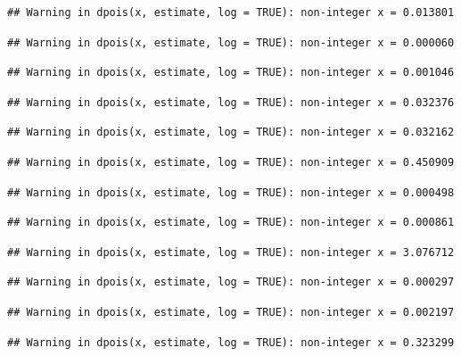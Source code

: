 \documentclass[]{article}
\begin{document}
\begin{verbatim}
## Warning in dpois(x, estimate, log = TRUE): non-integer x = 0.013801
\end{verbatim}

\begin{verbatim}
## Warning in dpois(x, estimate, log = TRUE): non-integer x = 0.000060
\end{verbatim}

\begin{verbatim}
## Warning in dpois(x, estimate, log = TRUE): non-integer x = 0.001046
\end{verbatim}

\begin{verbatim}
## Warning in dpois(x, estimate, log = TRUE): non-integer x = 0.032376
\end{verbatim}

\begin{verbatim}
## Warning in dpois(x, estimate, log = TRUE): non-integer x = 0.032162
\end{verbatim}

\begin{verbatim}
## Warning in dpois(x, estimate, log = TRUE): non-integer x = 0.450909
\end{verbatim}

\begin{verbatim}
## Warning in dpois(x, estimate, log = TRUE): non-integer x = 0.000498
\end{verbatim}

\begin{verbatim}
## Warning in dpois(x, estimate, log = TRUE): non-integer x = 0.000861
\end{verbatim}

\begin{verbatim}
## Warning in dpois(x, estimate, log = TRUE): non-integer x = 3.076712
\end{verbatim}

\begin{verbatim}
## Warning in dpois(x, estimate, log = TRUE): non-integer x = 0.000297
\end{verbatim}

\begin{verbatim}
## Warning in dpois(x, estimate, log = TRUE): non-integer x = 0.002197
\end{verbatim}

\begin{verbatim}
## Warning in dpois(x, estimate, log = TRUE): non-integer x = 0.323299
\end{verbatim}
\end{document}
